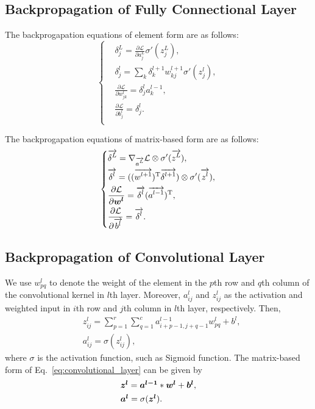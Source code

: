 \documentclass[10pt,onecolumn]{book}
\newcommand{\bm}[1]{\mbox{\boldmath{$#1$}}}
\begin{document}
\subsection{Backpropagation of Fully Connectional Layer}
The backprogapation equations of element form are as follows: 
\begin{equation}
\left\{
\begin{split}
& \delta^L_j = \frac{\partial \mathcal{L}}{\partial a^L_j} \sigma'(z^L_j), \\
& \delta^l_j = \sum_k \delta^{l+1}_k w^{l+1}_{kj} \sigma'(z^l_j), \\
& \frac{\partial \mathcal{L}}{\partial w^l_{jk}} = \delta^l_j a^{l - 1}_k, \\
& \frac{\partial \mathcal{L}}{\partial b^l_{j}} = \delta^l_j. \\
\end{split}
\right.
\tag{FC-BP}
\end{equation}

The backprogapation equations of matrix-based form are as follows:
\begin{equation}
\left\{
\begin{split}
& \overrightarrow{\delta^L} = \nabla_{\overrightarrow{a^L}}\mathcal{L} \otimes \sigma'(\overrightarrow{z^L}), 
\\
& \overrightarrow{\delta^l} = ((\overrightarrow{w^{l+1}})^\mathrm{T} \overrightarrow{\delta^{l+1}}) \otimes \sigma'(\overrightarrow{z^l}), 
\\
& \frac{\partial \mathcal{L}}{\partial \bm{w^l}} = \overrightarrow{\delta^l} (\overrightarrow{a^{l-1}})^\mathrm{T}, 
\\
& \frac{\partial \mathcal{L}}{\partial \overrightarrow{b^l}} = \overrightarrow{\delta^l}. \\
\end{split}
\right.
\end{equation}

\subsection{Backpropagation of Convolutional Layer}
We use $w^l_{pq}$ to denote the weight of the element in the $p$th row and $q$th column of the convolutional kernel in $l$th layer. Moreover, $a^l_{ij}$ and $z^l_{ij}$ as the activation and weighted input in $i$th row and $j$th column in $l$th layer, respectively. Then, 
\begin{equation}
\label{eq:convolutional_layer}
\begin{split}
& z^l_{ij} = \sum^r_{p=1} \sum^c_{q=1}  a^{l-1}_{i+p-1, j+q-1} w^l_{pq} + b^l, \\
& a^l_{ij} = \sigma(z^l_{ij}),
\end{split}
\end{equation}
where $\sigma$ is the activation function, such as Sigmoid function. The matrix-based form of Eq.~\ref{eq:convolutional_layer} can be given by
\begin{equation}
\begin{split}
& \bm{z^l} = \bm{a^{l-1}} * \bm{w^l} + \bm{b^l}, \\
& \bm{a^l} = \sigma(\bm{z^l}).
\end{split}
\end{equation}
\end{document}
